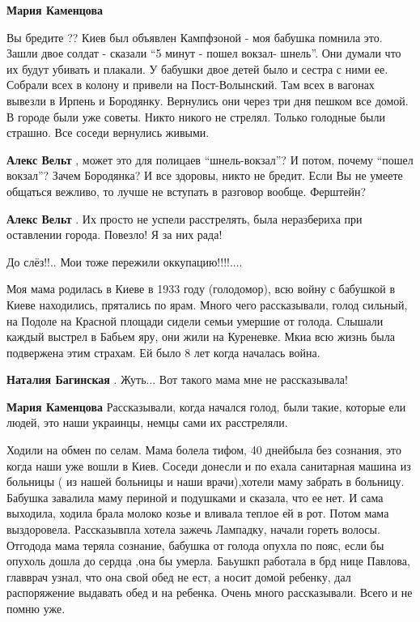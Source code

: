 \begin{itemize}
\begin{itemize}
\begin{itemize}
\textbf{Мария Каменцова} 

Вы бредите ?? Киев был объявлен Кампфзоной - моя бабушка помнила это. Зашли
двое солдат - сказали \enquote{5 минут - пошел вокзал- шнель}. Они думали что их будут
убивать и плакали. У бабушки двое детей было и сестра с ними ее. Собрали всех в
колону и привели на Пост-Волынский. Там всех в вагонах вывезли в Ирпень и
Бородянку. Вернулись они через три дня пешком все домой. В городе были уже
советы. Никто никого не стрелял. Только голодные были страшно. Все соседи
вернулись живыми.

\textbf{Алекс Вельт} , может это для полицаев \enquote{шнель-вокзал}?
И потом, почему \enquote{пошел вокзал}? Зачем Бородянка?
И все здоровы, никто не бредит. Если Вы не умеете общаться вежливо, то лучше не вступать в разговор вообще. Ферштейн?

\textbf{Алекс Вельт} . Их просто не успели расстрелять, была неразбериха при оставлении города. Повезло! Я за них рада!
\end{itemize} %

\end{itemize} %

До слёз!!.. Мои тоже пережили оккупацию!!!!....


Моя мама родилась в Киеве в 1933 году (голодомор), всю войну с бабушкой в Киеве
находились, прятались по ярам. Много чего рассказывали, голод сильный, на Подоле на
Красной площади сидели семьи умершие от голода. Слышали каждый выстрел в Бабьем
яру, они жили на Куреневке. Мкиа всю жизнь была подвержена этим страхам. Ей было 8
лет когда началась война.

\begin{itemize} %
\textbf{Наталия Багинская} . Жуть... Вот такого мама мне не рассказывала!

\textbf{Мария Каменцова} Рассказывали, когда начался голод, были такие, которые ели людей, это наши украинцы, немцы сами их расстреляли.


Ходили на обмен по селам. Мама болела тифом, 40 днейбыла без сознания, это когда
наши уже вошли в Киев. Соседи донесли и по ехала санитарная машина из больницы (
из нашей больницы и наши врачи),хотели маму забрать в больницу. Бабушка завалила
маму периной и подушками и сказала, что ее нет. И сама выходила, ходила брала
молоко козье и вливала теплое ей в рот. Потом мама выздоровела. Рассказывпла
хотела зажечь Лампадку, начали гореть волосы. Отгодода мама теряла
сознание, бабушка от голода опухла по пояс, если бы опухоль дошла до сердца ,она
бы умерла. Баьушкп работала в брд нице Павлова, главврач узнал, что она свой обед
не ест, а носит домой ребенку, дал распоряжение выдавать обед и на ребенка. Очень
много рассказывали. Всего и не помню уже.


\end{itemize}
\end{itemize}
